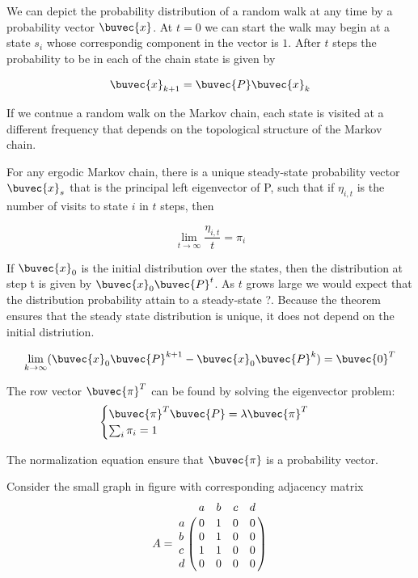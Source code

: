 We can depict the probability distribution of a random walk at any time by a probability vector $\buvec{x}$. At $t=0$ we can start the walk may begin at a state $s_i$ whose correspondig component in the vector is $1$. After $t$ steps the probability to be in each of the chain state is given by

\begin{equation}
 \buvec{x}_{k+1} = \buvec{P} \buvec{x}_k
\end{equation}

If we contnue a random walk on the Markov chain, each state is visited at a different frequency that depends on the topological structure of the Markov chain.

For any ergodic Markov chain, there is a unique steady-state probability vector $\buvec{x}_s$ that is the principal left eigenvector of P, such that if $\eta_{i,t}$ is the number of visits to state $i$ in $t$ steps, then

\begin{equation}
 \lim_{t \rightarrow \infty} \dfrac{\eta_{i,t}}{t} = \pi_i
\end{equation}

If $\buvec{x}_0$ is the initial distribution over the states, then the distribution at step t is given by $\buvec{x}_0 \buvec{P}^t$. As $t$ grows large we would expect that the distribution probability attain to a steady-state ?. Because the theorem ensures that the steady state distribution is unique, it does not depend on the initial distriution.

\begin{equation}
\lim_{k \rightarrow \infty} (\buvec{x}_0 \buvec{P}^{k+1} - \buvec{x}_0 \buvec{P}^k )= \buvec{0}^T
\end{equation}

The row vector $\buvec{\pi}^T$ can be found by solving the eigenvector problem:
\begin{equation}
\begin{cases}
    \buvec{\pi}^T \buvec{P} = \lambda \buvec{\pi}^T\\
    \sum_i \pi_i = 1
  \end{cases}
\end{equation}

The normalization equation ensure that $\buvec{\pi}$ is a probability vector.



Consider the small graph in figure with corresponding adjacency matrix
\begin{equation}
A = 
\bordermatrix{
  & a & b & c & d \cr
a & 0 & 1 & 0 & 0 \cr
b & 0 & 1 & 0 & 0 \cr
c & 1 & 1 & 0 & 0 \cr
d & 0 & 0 & 0 & 0 \cr}
\end{equation}

